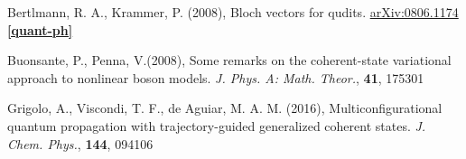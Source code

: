 \documentclass[12pt]{article}
\begin{document}
\begin{thebibliography}{10}
	Bertlmann, R. A., Krammer, P. (2008), Bloch vectors for qudits. \href{ 	
https://doi.org/10.48550/arXiv.0806.1174}{arXiv:0806.1174 \textbf{[quant-ph]}}

	Buonsante, P., Penna, V.(2008), Some remarks on the coherent-state variational approach to nonlinear boson models. \textit{J. Phys. A: Math. Theor.}, \textbf{41}, 175301
	
	Grigolo, A., Viscondi, T. F., de Aguiar, M. A. M. (2016), Multiconfigurational quantum propagation with trajectory-guided generalized coherent states. \textit{J. Chem. Phys.}, \textbf{144}, 094106

	\end{thebibliography}
	
	
	
	
	

	
	
\end{document}
